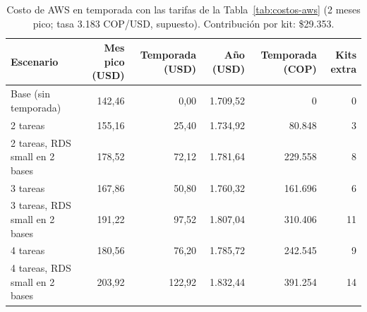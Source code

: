 \begin{table}[!htbp]
\centering
\caption{Costo de AWS en temporada con las tarifas de la Tabla~\ref{tab:costos-aws} (2 meses pico; tasa 3.183 COP/USD, supuesto). Contribución por kit: \$29.353.}
\label{tab:costo-temporada}
\footnotesize
\begin{tabular}{@{}lrrrrr@{}}
\toprule
\textbf{Escenario} & \textbf{Mes pico (USD)} & \textbf{Temporada (USD)} & \textbf{Año (USD)} & \textbf{Temporada (COP)} & \textbf{Kits extra} \\
\midrule
Base (sin temporada) & 142,46 & 0,00 & 1.709,52 & 0 & 0 \\
2 tareas & 155,16 & 25,40 & 1.734,92 & 80.848 & 3 \\
2 tareas, RDS small en 2 bases & 178,52 & 72,12 & 1.781,64 & 229.558 & 8 \\
3 tareas & 167,86 & 50,80 & 1.760,32 & 161.696 & 6 \\
3 tareas, RDS small en 2 bases & 191,22 & 97,52 & 1.807,04 & 310.406 & 11 \\
4 tareas & 180,56 & 76,20 & 1.785,72 & 242.545 & 9 \\
4 tareas, RDS small en 2 bases & 203,92 & 122,92 & 1.832,44 & 391.254 & 14 \\
\bottomrule
\end{tabular}
\end{table}
